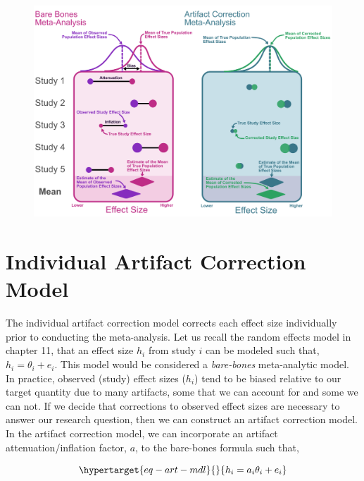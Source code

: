 \documentclass[
  letterpaper,
  DIV=11,
  numbers=noendperiod]{scrreprt}
\begin{document}
\begin{figure}[H]

{\centering \includegraphics{figure/correction_forest.png}

}

\end{figure}

\hypertarget{individual-artifact-correction-model}{%
\section{Individual Artifact Correction
Model}\label{individual-artifact-correction-model}}

The individual artifact correction model corrects each effect size
individually prior to conducting the meta-analysis. Let us recall the
random effects model in chapter 11, that an effect size \(h_i\) from
study \(i\) can be modeled such that, \(h_i=\theta_i+e_i\). This model
would be considered a \emph{bare-bones} meta-analytic model. In
practice, observed (study) effect sizes (\(h_i\)) tend to be biased
relative to our target quantity due to many artifacts, some that we can
account for and some we can not. If we decide that corrections to
observed effect sizes are necessary to answer our research question,
then we can construct an artifact correction model. In the artifact
correction model, we can incorporate an artifact attenuation/inflation
factor, \(a\), to the bare-bones formula such that,

\begin{equation}\protect\hypertarget{eq-art-mdl}{}{
h_{i} = a_i\theta_i + e_i
}\label{eq-art-mdl}\end{equation}
\end{document}
